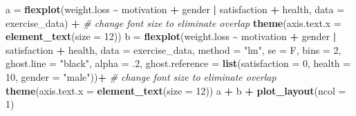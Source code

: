 \documentclass[
  man]{apa6}
\newenvironment{Shaded}{\begin{snugshade}}{\end{snugshade}}
\newcommand{\CommentTok}[1]{\textcolor[rgb]{0.56,0.35,0.01}{\textit{#1}}}
\newcommand{\DataTypeTok}[1]{\textcolor[rgb]{0.13,0.29,0.53}{#1}}
\newcommand{\DecValTok}[1]{\textcolor[rgb]{0.00,0.00,0.81}{#1}}
\newcommand{\FloatTok}[1]{\textcolor[rgb]{0.00,0.00,0.81}{#1}}
\newcommand{\KeywordTok}[1]{\textcolor[rgb]{0.13,0.29,0.53}{\textbf{#1}}}
\newcommand{\NormalTok}[1]{#1}
\newcommand{\OperatorTok}[1]{\textcolor[rgb]{0.81,0.36,0.00}{\textbf{#1}}}
\newcommand{\StringTok}[1]{\textcolor[rgb]{0.31,0.60,0.02}{#1}}
\begin{document}
\begin{Shaded}
\begin{Highlighting}[]
\NormalTok{a =}\StringTok{ }\KeywordTok{flexplot}\NormalTok{(weight.loss }\OperatorTok{\textasciitilde{}}\StringTok{ }\NormalTok{motivation }\OperatorTok{+}\StringTok{ }\NormalTok{gender }\OperatorTok{|}\StringTok{ }\NormalTok{satisfaction }\OperatorTok{+}\StringTok{ }\NormalTok{health, }
    \DataTypeTok{data =}\NormalTok{ exercise\_data) }\OperatorTok{+}
\StringTok{  }\CommentTok{\# change font size to eliminate overlap}
\StringTok{    }\KeywordTok{theme}\NormalTok{(}\DataTypeTok{axis.text.x =} 
            \KeywordTok{element\_text}\NormalTok{(}\DataTypeTok{size =} \DecValTok{12}\NormalTok{))}
\NormalTok{b =}\StringTok{ }\KeywordTok{flexplot}\NormalTok{(weight.loss }\OperatorTok{\textasciitilde{}}\StringTok{ }\NormalTok{motivation }\OperatorTok{+}\StringTok{ }\NormalTok{gender }\OperatorTok{|}\StringTok{ }\NormalTok{satisfaction }\OperatorTok{+}\StringTok{ }\NormalTok{health, }
    \DataTypeTok{data =}\NormalTok{ exercise\_data, }
    \DataTypeTok{method =} \StringTok{"lm"}\NormalTok{, }\DataTypeTok{se =}\NormalTok{ F, }\DataTypeTok{bins =} \DecValTok{2}\NormalTok{, }\DataTypeTok{ghost.line =} \StringTok{"black"}\NormalTok{, }\DataTypeTok{alpha =} \FloatTok{.2}\NormalTok{,}
    \DataTypeTok{ghost.reference =} \KeywordTok{list}\NormalTok{(}\DataTypeTok{satisfaction =} \DecValTok{0}\NormalTok{, }\DataTypeTok{health =} \DecValTok{10}\NormalTok{, }\DataTypeTok{gender =} \StringTok{"male"}\NormalTok{))}\OperatorTok{+}
\StringTok{  }\CommentTok{\# change font size to eliminate overlap}
\StringTok{    }\KeywordTok{theme}\NormalTok{(}\DataTypeTok{axis.text.x =} 
            \KeywordTok{element\_text}\NormalTok{(}\DataTypeTok{size =} \DecValTok{12}\NormalTok{))}
\NormalTok{a }\OperatorTok{+}\StringTok{ }\NormalTok{b }\OperatorTok{+}\StringTok{ }\KeywordTok{plot\_layout}\NormalTok{(}\DataTypeTok{ncol =} \DecValTok{1}\NormalTok{)}
\end{Highlighting}
\end{Shaded}
\end{document}
